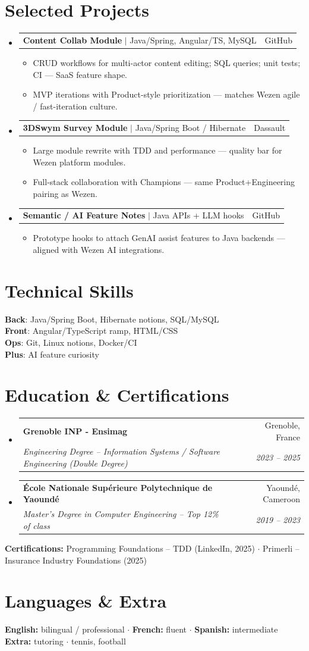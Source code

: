 \documentclass[letterpaper,10.5pt]{article}
\makeatletter
\newcommand{\resumeItem}[1]{\item\small{#1 \vspace{-1.5pt}}}
\newcommand{\resumeSubheading}[4]{\vspace{-1pt}\item\begin{tabular*}{0.97\textwidth}[t]{l@{\extracolsep{\fill}}r}\textbf{#1} & #2 \\\textit{\small#3} & \textit{\small #4} \\\end{tabular*}\vspace{-5pt}}
\newcommand{\resumeProjectHeading}[2]{\item\begin{tabular*}{0.97\textwidth}{l@{\extracolsep{\fill}}r}\small#1 & #2 \\\end{tabular*}\vspace{-5pt}}
\newcommand{\resumeSubHeadingListStart}{\begin{itemize}[leftmargin=0.15in, label={}]}
\newcommand{\resumeSubHeadingListEnd}{\end{itemize}}
\newcommand{\resumeItemListStart}{\begin{itemize}[leftmargin=0.18in]}
\newcommand{\resumeItemListEnd}{\end{itemize}\vspace{-3pt}}
\makeatother
\begin{document}
\section{Selected Projects}
\resumeSubHeadingListStart
  \resumeProjectHeading{\textbf{Content Collab Module} $|$ Java/Spring, Angular/TS, MySQL}{GitHub}
    \resumeItemListStart
      \resumeItem{CRUD workflows for multi-actor content editing; SQL queries; unit tests; CI --- SaaS feature shape.}
      \resumeItem{MVP iterations with Product-style prioritization --- matches Wezen agile / fast-iteration culture.}
    \resumeItemListEnd
  \resumeProjectHeading{\textbf{3DSwym Survey Module} $|$ Java/Spring Boot / Hibernate}{Dassault}
    \resumeItemListStart
      \resumeItem{Large module rewrite with TDD and performance --- quality bar for Wezen platform modules.}
      \resumeItem{Full-stack collaboration with Champions --- same Product+Engineering pairing as Wezen.}
    \resumeItemListEnd
  \resumeProjectHeading{\textbf{Semantic / AI Feature Notes} $|$ Java APIs + LLM hooks}{GitHub}
    \resumeItemListStart
      \resumeItem{Prototype hooks to attach GenAI assist features to Java backends --- aligned with Wezen AI integrations.}
    \resumeItemListEnd
\resumeSubHeadingListEnd
\section{Technical Skills}
\begin{itemize}[leftmargin=0.15in, label={}]\small{\item{\textbf{Back}: Java/Spring Boot, Hibernate notions, SQL/MySQL \\ \textbf{Front}: Angular/TypeScript ramp, HTML/CSS \\ \textbf{Ops}: Git, Linux notions, Docker/CI \\ \textbf{Plus}: AI feature curiosity}}\end{itemize}
\section{Education \& Certifications}
\resumeSubHeadingListStart
  \resumeSubheading{Grenoble INP - Ensimag}{Grenoble, France}{Engineering Degree -- Information Systems / Software Engineering (Double Degree)}{2023 -- 2025}
  \resumeSubheading{\'Ecole Nationale Sup\'erieure Polytechnique de Yaound\'e}{Yaound\'e, Cameroon}{Master's Degree in Computer Engineering -- Top 12\% of class}{2019 -- 2023}
\resumeSubHeadingListEnd
\small{\textbf{Certifications:} Programming Foundations -- TDD (LinkedIn, 2025) $\cdot$ Primerli -- Insurance Industry Foundations (2025)}
\section{Languages \& Extra}
\small{\textbf{English:} bilingual / professional $\cdot$ \textbf{French:} fluent $\cdot$ \textbf{Spanish:} intermediate \\ \textbf{Extra:} tutoring $\cdot$ tennis, football}
\end{document}
